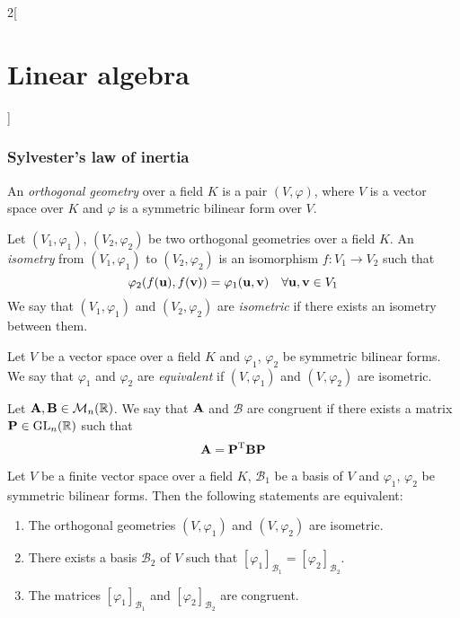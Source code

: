 \documentclass[../../../main_math.tex]{subfiles}
\begin{document}
\begin{multicols}{2}[\section{Linear algebra}]
  \subsubsection{Sylvester's law of inertia}
  \begin{definition}
    An \emph{orthogonal geometry} over a field $K$ is a pair $(V,\varphi)$, where $V$ is a vector space over $K$ and $\varphi$ is a symmetric bilinear form over $V$.
  \end{definition}
  \begin{definition}\label{LA_isometry}
    Let $(V_1,\varphi_1)$, $(V_2,\varphi_2)$ be two orthogonal geometries over a field $K$. An \emph{isometry} from $(V_1,\varphi_1)$ to $(V_2,\varphi_2)$ is an isomorphism $f:V_1\rightarrow V_2$ such that $$\varphi_2(f(\boldsymbol{\mathrm{u}}),f(\boldsymbol{\mathrm{v}}))=\varphi_1(\boldsymbol{\mathrm{u}},\boldsymbol{\mathrm{v}})\quad\forall\boldsymbol{\mathrm{u}},\boldsymbol{\mathrm{v}}\in V_1$$ We say that $(V_1,\varphi_1)$ and $(V_2,\varphi_2)$ are \emph{isometric} if there exists an isometry between them.
  \end{definition}
  \begin{definition}
    Let $V$ be a vector space over a field $K$ and $\varphi_1$, $\varphi_2$ be symmetric bilinear forms. We say that $\varphi_1$ and $\varphi_2$ are \emph{equivalent} if $(V,\varphi_1)$ and $(V,\varphi_2)$ are isometric.
  \end{definition}
  \begin{definition}
    Let $\boldsymbol{\mathrm{A}},\boldsymbol{\mathrm{B}}\in\mathcal{M}_n(\mathbb{R})$. We say that $\boldsymbol{\mathrm{A}}$ and $\mathcal{B}$ are congruent if there exists a matrix $\boldsymbol{\mathrm{P}}\in\mathrm{GL}_n(\mathbb{R})$ such that $$\boldsymbol{\mathrm{A}}={\boldsymbol{\mathrm{P}}}^{\mathrm{T}}\boldsymbol{\mathrm{B}}\boldsymbol{\mathrm{P}}$$
  \end{definition}
  \begin{proposition}
    Let $V$ be a finite vector space over a field $K$, $\mathcal{B}_1$ be a basis of $V$ and $\varphi_1$, $\varphi_2$ be symmetric bilinear forms. Then the following statements are equivalent:
    \begin{enumerate}
      \item The orthogonal geometries $(V,\varphi_1)$ and $(V,\varphi_2)$ are isometric.
      \item There exists a basis $\mathcal{B}_2$ of $V$ such that $[\varphi_1]_{\mathcal{B}_1}=[\varphi_2]_{\mathcal{B}_2}$.
      \item The matrices $[\varphi_1]_{\mathcal{B}_1}$ and $[\varphi_2]_{\mathcal{B}_2}$ are congruent.
    \end{enumerate}
  \end{proposition}
  \begin{theorem}

\end{theorem}
\end{multicols}
\end{document}
